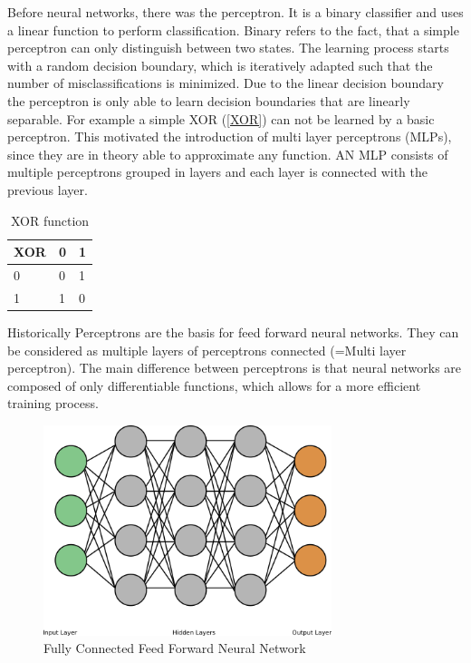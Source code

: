 \documentclass[draft,final,oneside]{vutinfth} %
\begin{document}
Before neural networks, there was the perceptron. It is a binary classifier and uses a linear function to perform classification. Binary refers to the fact, that a simple perceptron can only distinguish between two states. The learning process starts with a random decision boundary, which is iteratively adapted such that the number of misclassifications is minimized. Due to the linear decision boundary the perceptron is only able to learn decision boundaries that are linearly separable. For example a simple XOR (\ref{XOR}) can not be learned by a basic perceptron. This motivated the introduction of multi layer perceptrons (MLPs), since they are in theory able to approximate any function. AN MLP consists of multiple perceptrons grouped in layers and each layer is connected with the previous layer.

\begin{table}[]
\centering
\begin{tabular}{|l|l|l|}
\hline
XOR & 0 & 1 \\ \hline
0   & 0 & 1 \\ \hline
1   & 1 & 0 \\ \hline
\end{tabular}
\label{xor}
\caption{XOR function}
\end{table}

Historically Perceptrons are the basis for feed forward neural networks. They can be considered as multiple layers of perceptrons connected (=Multi layer perceptron). The main difference between perceptrons is that neural networks are composed of only differentiable functions, which allows for a more efficient training process.

\begin{figure}[ht]
	\centering
  	\includegraphics[width=0.75\textwidth]{graphics/simple_neural_network.png}
	\caption{Fully Connected Feed Forward Neural Network}
	\label{fig:feedforward}
\end{figure}
\end{document}
